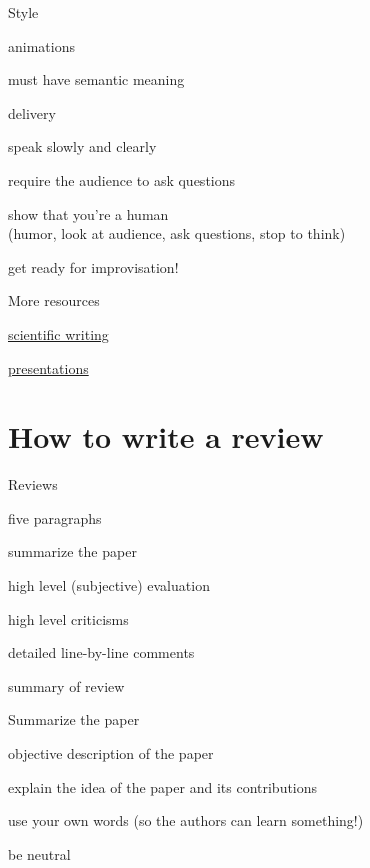 \documentclass[presentation,xcolor={usenames,dvipsnames}]{beamer}
\begin{document}
\begin{frame}{Style}

animations
\bit
\item must have semantic meaning
\eit

delivery
\bit
\item speak slowly and clearly
\item require the audience to ask questions
\item show that you're a human \\
(humor, look at audience, ask questions, stop to think)
\item get ready for improvisation!
\eit

\end{frame}

\begin{frame}{More resources}

  \bit
  \item \href{http://www.americanscientist.org/issues/id.877,y.0,no.,content.true,page.1,css.print/issue.aspx}{scientific writing}
  \item \href{http://acmg.seas.harvard.edu/education/presentations/carlton_presentations.pdf}{presentations}
  \eit

\end{frame}

\section{How to write a review}

\begin{frame}{Reviews}

five paragraphs
\bit
\item summarize the paper
\item high level (subjective) evaluation
\item high level criticisms
\item detailed line-by-line comments
\item summary of review
\eit

\end{frame}

\begin{frame}{Summarize the paper}

objective description of the paper
\bit
\item explain the idea of the paper and its contributions
\item use your own words (so the authors can learn something!)
\item be neutral
\eit

\end{frame}
\end{document}
